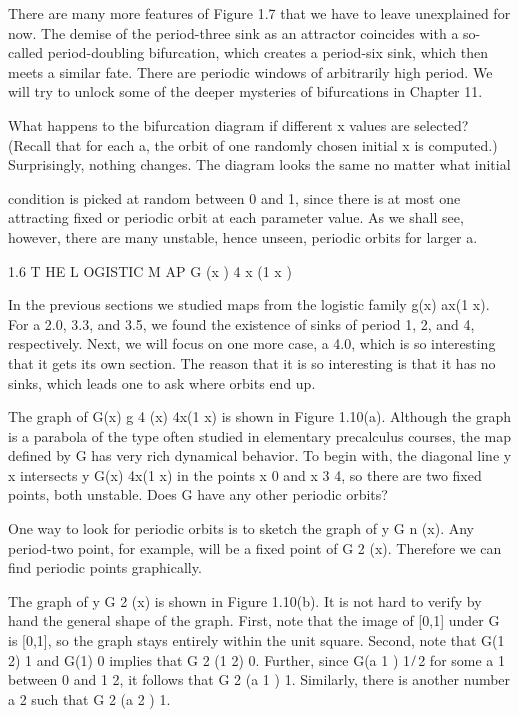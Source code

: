 \documentclass[12pt]{article}
\begin{document}
There are many more features of Figure 1.7 that we have to leave unexplained for now. The demise of the 
period-three sink as an attractor coincides with a so-called period-doubling bifurcation, which creates a 
period-six sink, which then meets a similar fate. There are periodic windows of arbitrarily high period. We 
will try to unlock some of the deeper mysteries of bifurcations in Chapter 11.

What happens to the bifurcation diagram if different x values are selected? (Recall that for each a, the 
orbit of one randomly chosen initial x is computed.) Surprisingly, nothing changes. The diagram looks the 
same no matter what initial

condition is picked at random between 0 and 1, since there is at most one attracting fixed or periodic 
orbit at each parameter value. As we shall see, however, there are many unstable, hence unseen, periodic 
orbits for larger a.

1.6 T HE L OGISTIC M AP G (x )  4 x (1  x )

In the previous sections we studied maps from the logistic family g(x)  ax(1  x). For a  2.0, 3.3, and 3.5, 
we found the existence of sinks of period 1, 2, and 4, respectively. Next, we will focus on one more case, 
a  4.0, which is so interesting that it gets its own section. The reason that it is so interesting is that 
it has no sinks, which leads one to ask where orbits end up.

The graph of G(x)  g 4 (x)  4x(1  x) is shown in Figure 1.10(a). Although the graph is a parabola of the 
type often studied in elementary precalculus courses, the map defined by G has very rich dynamical 
behavior. To begin with, the diagonal line y  x intersects y  G(x)  4x(1  x) in the points x  0 and x  3  
4, so there are two fixed points, both unstable. Does G have any other periodic orbits?

One way to look for periodic orbits is to sketch the graph of y  G n (x). Any period-two point, for 
example, will be a fixed point of G 2 (x). Therefore we can find periodic points graphically.

The graph of y  G 2 (x) is shown in Figure 1.10(b). It is not hard to verify by hand the general shape of 
the graph. First, note that the image of [0,1] under G is [0,1], so the graph stays entirely within the 
unit square. Second, note that G(1  2)  1 and G(1)  0 implies that G 2 (1  2)  0. Further, since G(a 1 )  1 
̸ 2 for some a 1 between 0 and 1  2, it follows that G 2 (a 1 )  1. Similarly, there is another number a 2 
such that G 2 (a 2 )  1.
\end{document}
